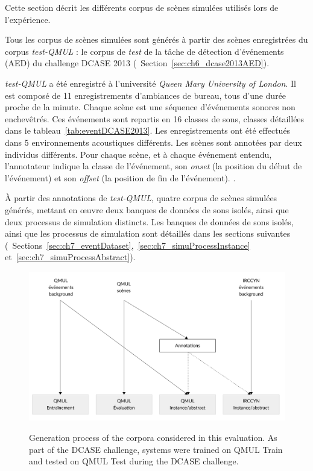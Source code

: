 Cette section décrit les différents corpus de scènes simulées utilisés lors de l'expérience. 

Tous les corpus de scènes simulées sont générés à partir des scènes enregistrées du corpus \emph{test-QMUL} : le corpus de \emph{test} de la tâche de détection d'événements (AED) du challenge DCASE 2013  \citep{giannoulis2013detection} (\cf~Section~\ref{sec:ch6_dcase2013AED}). 

\emph{test-QMUL} a été enregistré à l'université \emph{Queen Mary University of London}. Il est composé de 11 enregistrements d'ambiances de bureau, tous d'une durée proche de la minute. Chaque scène est une séquence d'événements sonores non enchevêtrés. Ces événements sont repartis en 16 classes de sons, classes détaillées dans le tableau~\ref{tab:eventDCASE2013}. Les enregistrements ont été effectués dans 5 environnements acoustiques différents. Les scènes sont annotées par deux individus différents. Pour chaque scène, et à chaque événement entendu, l'annotateur indique la classe de l'événement, son \emph{onset} (la position du début de l'événement) et son \emph{offset} (la position de fin de l'événement).  .


À partir des annotations de \emph{test-QMUL}, quatre corpus de scènes simulées   générés, mettant en œuvre deux banques de données de sons isolés, ainsi que deux processus de simulation distincts. Les banques de données de sons isolés, ainsi que les processus de simulation sont détaillés dans les sections suivantes (\cf~Sections~\ref{sec:ch7_eventDataset},~\ref{sec:ch7_simuProcessInstance} et~\ref{sec:ch7_simuProcessAbstract}). 

\begin{figure}[t]
\begin{center}
\includegraphics[width=1\textwidth]{gfx/ch_7/databasesTasslp.pdf}
\label{fig:databasesDCASE2013Simu}
\caption{Generation process of the corpora considered in this evaluation. As part of the DCASE challenge, systems were trained on QMUL Train and tested on QMUL Test during the DCASE challenge.} 
\end{center}
\end{figure}

